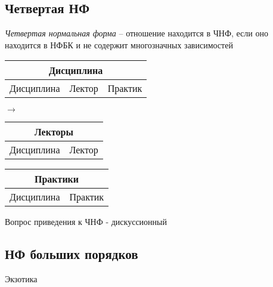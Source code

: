 \documentclass[12pt, a4paper]{article}
\begin{document}
\subsection{Четвертая НФ}

\emph{Четвертая нормальная форма} -- отношение находится в ЧНФ, если оно находится в НФБК и не содержит многозначных зависимостей


    \begin{tabular}{|c|c|c|}
         \hline \multicolumn{3}{|c|}{Дисциплина}\\
         \hline Дисциплина & Лектор & Практик \\
         \hline
    \end{tabular}
    $\rightarrow$
    \begin{tabular}{|c|c|}
         \hline \multicolumn{2}{|c|}{Лекторы}\\
         \hline Дисциплина & Лектор \\
         \hline
    \end{tabular}
    \begin{tabular}{|c|c|}
         \hline \multicolumn{2}{|c|}{Практики}\\
         \hline Дисциплина & Практик \\
         \hline
    \end{tabular}

Вопрос приведения к ЧНФ - дискуссионный

\subsection{НФ больших порядков}

Экзотика
\end{document}
